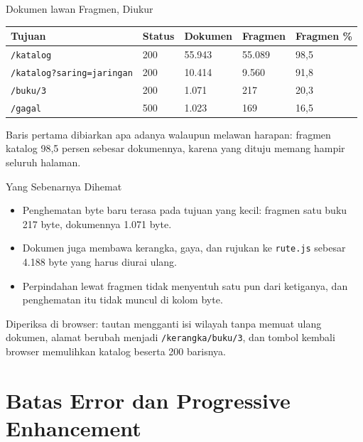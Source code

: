 \documentclass[aspectratio=169, table, 12pt]{beamer}
\begin{document}
\begin{frame}{{\Large Dokumen lawan Fragmen, Diukur}}
  \vspace{6pt}
  \centering
  {\footnotesize
  \begin{tabularx}{\textwidth}{Yllll}
    \hline
    \textbf{Tujuan} & \textbf{Status} & \textbf{Dokumen} & \textbf{Fragmen} & \textbf{Fragmen \%} \\
    \hline
    \texttt{/katalog} & 200 & 55.943 & 55.089 & 98,5 \\
    \hline
    \texttt{/katalog?saring=jaringan} & 200 & 10.414 & 9.560 & 91,8 \\
    \hline
    \texttt{/buku/3} & 200 & 1.071 & 217 & 20,3 \\
    \hline
    \texttt{/gagal} & 500 & 1.023 & 169 & 16,5 \\
    \hline
  \end{tabularx}}

  \vspace{6pt}
  {\small Baris pertama dibiarkan apa adanya walaupun melawan harapan:
  fragmen katalog 98,5 persen sebesar dokumennya, karena yang dituju memang
  hampir seluruh halaman.}
\end{frame}

\begin{frame}{{\Large Yang Sebenarnya Dihemat}}
  \vspace{10pt}
  \begin{itemize}
    \item Penghematan byte baru terasa pada tujuan yang kecil: fragmen satu
          buku 217 byte, dokumennya 1.071 byte.
    \item Dokumen juga membawa kerangka, gaya, dan rujukan ke
          \texttt{rute.js} sebesar 4.188 byte yang harus diurai ulang.
    \item Perpindahan lewat fragmen tidak menyentuh satu pun dari ketiganya,
          dan penghematan itu tidak muncul di kolom byte.
  \end{itemize}
  \vspace{6pt}
  {\small Diperiksa di browser: tautan mengganti isi wilayah tanpa memuat
  ulang dokumen, alamat berubah menjadi \texttt{/kerangka/buku/3}, dan tombol
  kembali browser memulihkan katalog beserta 200 barisnya.}
\end{frame}

\section{Batas Error dan Progressive Enhancement}
\end{document}
